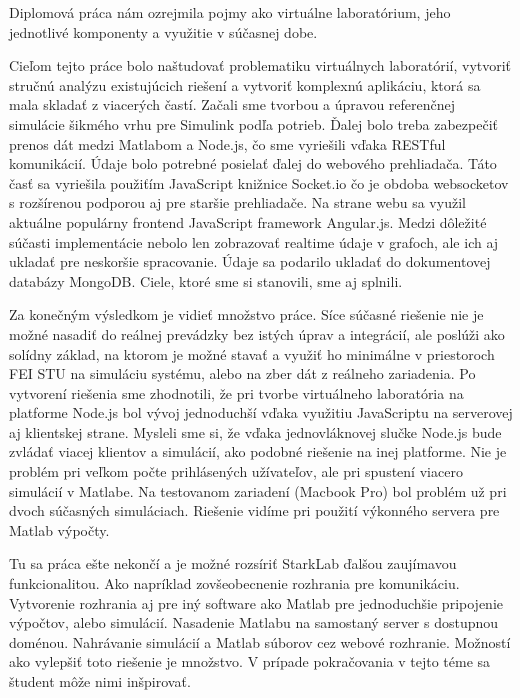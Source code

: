 \indent Diplomová práca nám ozrejmila pojmy ako virtuálne laboratórium, jeho jednotlivé komponenty a využitie v súčasnej dobe.

Cieľom tejto práce bolo naštudovať problematiku virtuálnych laboratórií, vytvoriť stručnú analýzu existujúcich riešení a vytvoriť komplexnú aplikáciu, ktorá sa mala skladať z viacerých častí. Začali sme tvorbou a úpravou referenčnej simulácie šikmého vrhu pre Simulink podľa potrieb. Ďalej bolo treba zabezpečiť prenos dát medzi Matlabom a Node.js, čo sme vyriešili vďaka RESTful komunikácií. Údaje bolo potrebné posielať ďalej do webového prehliadača. Táto časť sa vyriešila použiťím JavaScript knižnice Socket.io čo je obdoba websocketov s rozšírenou podporou aj pre staršie prehliadače. Na strane webu sa využil aktuálne populárny frontend JavaScript framework Angular.js. Medzi dôležité súčasti implementácie nebolo len zobrazovať realtime údaje v grafoch, ale ich aj ukladať pre neskoršie spracovanie. Údaje sa podarilo ukladať do dokumentovej databázy MongoDB.
Ciele, ktoré sme si stanovili, sme aj splnili.

Za konečným výsledkom je vidieť množstvo práce. Síce súčasné riešenie nie je možné nasadiť do reálnej prevádzky bez istých úprav a integrácií, ale poslúži ako solídny základ, na ktorom je možné stavať a využiť ho minimálne v priestoroch FEI STU na simuláciu systému, alebo na zber dát z reálneho zariadenia. Po vytvorení riešenia sme zhodnotili, že pri tvorbe virtuálneho laboratória na platforme Node.js bol vývoj jednoduchší vďaka využitiu JavaScriptu na serverovej aj klientskej strane. Mysleli sme si, že vďaka jednovláknovej slučke Node.js bude zvládať viacej klientov a simulácií, ako podobné riešenie na inej platforme. Nie je problém pri veľkom počte prihlásených užívateľov, ale pri spustení viacero simulácií v Matlabe. Na testovanom zariadení (Macbook Pro) bol problém už pri dvoch súčasných simuláciach. Riešenie vidíme pri použití výkonného servera pre Matlab výpočty.

Tu sa práca ešte nekončí a je možné rozsíriť StarkLab ďalšou zaujímavou funkcionalitou. Ako napríklad zovšeobecnenie rozhrania pre komunikáciu. Vytvorenie rozhrania aj pre iný software ako Matlab pre jednoduchšie pripojenie výpočtov, alebo simulácií. Nasadenie Matlabu na samostaný server s dostupnou doménou. Nahrávanie simulácií a Matlab súborov cez webové rozhranie. Možností ako vylepšiť toto riešenie je množstvo. V prípade pokračovania v tejto téme sa študent môže nimi inšpirovať.